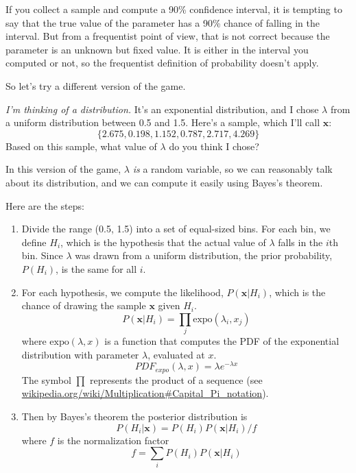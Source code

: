\documentclass[12pt]{book}
\begin{document}
If you collect a sample and compute a 90\% confidence interval, it is
tempting to say that the true value of the parameter has a 90\% chance
of falling in the interval.  But from a frequentist point of view,
that is not correct because the parameter is an unknown but fixed
value.  It is either in the interval you computed or not, so the
frequentist definition of probability doesn't apply.

So let's try a different version of the game.

\newcommand{\boldx}{\mathbf{x}}

{\em I'm thinking of a distribution.}  It's an exponential
distribution, and I chose $\lambda$ from a uniform distribution
between 0.5 and 1.5.  Here's a sample, which I'll call $\boldx$:
%
\[ \{ 2.675, 0.198, 1.152, 0.787, 2.717, 4.269 \} \]
%
Based on this sample, what value of $\lambda$ do you think I chose?

In this version of the game, $\lambda$ {\em is} a random variable, so we
can reasonably talk about its distribution, and we can compute it
easily using Bayes's theorem.

Here are the steps:

\begin{enumerate}

\item Divide the range (0.5, 1.5) into a set of equal-sized bins.
For each bin, we define $H_i$, which is the hypothesis that the
actual value of $\lambda$ falls in the $i$th bin.
Since $\lambda$ was drawn from a uniform distribution, the prior
probability, $P(H_i)$, is the same for all $i$.

\item For each hypothesis, we compute the likelihood, $P(\boldx|H_i)$,
which is the chance of drawing the sample $\boldx$ given $H_i$.
%
\[ P(\boldx|H_i) = \prod_j \mathrm{expo}(\lambda_i, x_j)  \]
%
where $\mathrm{expo}(\lambda, x)$ is a function that
computes the PDF of the exponential distribution with parameter $\lambda$,
evaluated at $x$.  
%
\[ PDF_{expo}(\lambda, x) = \lambda e^{-\lambda x}\]
%
The symbol $\prod$ represents the product of a sequence (see
\url{wikipedia.org/wiki/Multiplication#Capital_Pi_notation}).

\item Then by Bayes's theorem the posterior distribution is
%
\[ P(H_i|\boldx) =  P(H_i) P(\boldx|H_i) / f \]
%
where $f$ is the normalization factor
%
\[ f = \sum_i P(H_i) P(\boldx|H_i) \]
%
\end{enumerate}
\end{document}
